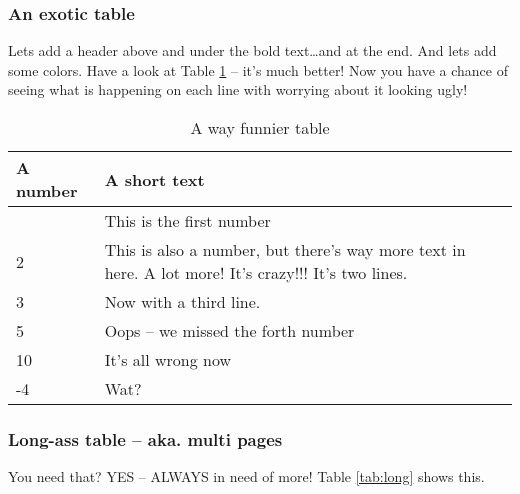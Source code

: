 \subsubsection{An exotic table}

Lets add a header above and under the bold text\dots and at the end.
And lets add some colors.
Have a look at Table \ref{tab:exotic} -- it's much better!
Now you have a chance of seeing what is happening on each line with worrying about it looking ugly!

\begin{table}[htbp]
	\centering
	\begin{tabularx}{\textwidth}{l X} \hline
	\hiderowcolors %
	\textbf{A number} & \textbf{A short text}  \\ \hline
	\showrowcolors %
	1 & This is the first number \\
	2 & This is also a number, but there's way more text in here. A lot more! It's crazy!!! It's two lines. \\
	3 & Now with a third line. \\
	5 & Oops -- we missed the forth number \\
	10 & It's all wrong now \\
	-4 & Wat? \\ \hline
	\end{tabularx}
	\caption{A way funnier table}
	\label{tab:exotic}
\end{table}

\newpage
\subsubsection{Long-ass table -- aka. multi pages}

You need that?
YES -- ALWAYS in need of more!
Table \ref{tab:long} shows this.

